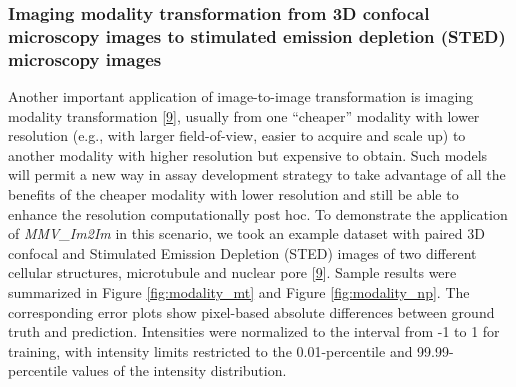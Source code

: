 \hypertarget{imaging-modality-transformation-from-3d-confocal-microscopy-images-to-stimulated-emission-depletion-sted-microscopy-images}{%
\subsubsection{Imaging modality transformation from 3D confocal microscopy images to stimulated emission depletion (STED) microscopy images}\label{imaging-modality-transformation-from-3d-confocal-microscopy-images-to-stimulated-emission-depletion-sted-microscopy-images}}

Another important application of image-to-image transformation is imaging modality transformation {[}\protect\hyperlink{ref-UEBDZ3tI}{9}{]}, usually from one ``cheaper'' modality with lower resolution (e.g., with larger field-of-view, easier to acquire and scale up) to another modality with higher resolution but expensive to obtain. Such models will permit a new way in assay development strategy to take advantage of all the benefits of the cheaper modality with lower resolution and still be able to enhance the resolution computationally post hoc. To demonstrate the application of \emph{MMV\_Im2Im} in this scenario, we took an example dataset with paired 3D confocal and Stimulated Emission Depletion (STED) images of two different cellular structures, microtubule and nuclear pore {[}\protect\hyperlink{ref-UEBDZ3tI}{9}{]}. Sample results were summarized in Figure \ref{fig:modality_mt} and Figure \ref{fig:modality_np}. The corresponding error plots show pixel-based absolute differences between ground truth and prediction. Intensities were normalized to the interval from -1 to 1 for training, with intensity limits restricted to the 0.01-percentile and 99.99-percentile values of the intensity distribution.

